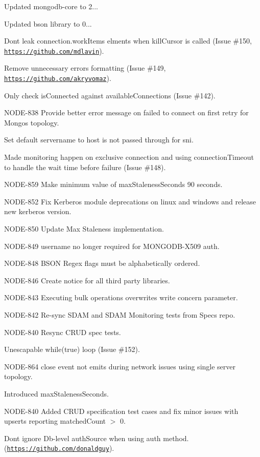 \begin{DoxyItemize}
\item Updated mongodb-\/core to 2...
\begin{DoxyItemize}
\item Updated bson library to 0...
\item Dont leak connection.\+work\+Items elments when kill\+Cursor is called (Issue \#150, \href{https://github.com/mdlavin}{\tt https\+://github.\+com/mdlavin}).
\item Remove unnecessary errors formatting (Issue \#149, \href{https://github.com/akryvomaz}{\tt https\+://github.\+com/akryvomaz}).
\item Only check is\+Connected against available\+Connections (Issue \#142).
\item N\+O\+D\+E-\/838 Provide better error message on failed to connect on first retry for Mongos topology.
\item Set default servername to host is not passed through for sni.
\item Made monitoring happen on exclusive connection and using connection\+Timeout to handle the wait time before failure (Issue \#148).
\item N\+O\+D\+E-\/859 Make minimum value of max\+Staleness\+Seconds 90 seconds.
\item N\+O\+D\+E-\/852 Fix Kerberos module deprecations on linux and windows and release new kerberos version.
\item N\+O\+D\+E-\/850 Update Max Staleness implementation.
\item N\+O\+D\+E-\/849 username no longer required for M\+O\+N\+G\+O\+D\+B-\/\+X509 auth.
\item N\+O\+D\+E-\/848 B\+S\+ON Regex flags must be alphabetically ordered.
\item N\+O\+D\+E-\/846 Create notice for all third party libraries.
\item N\+O\+D\+E-\/843 Executing bulk operations overwrites write concern parameter.
\item N\+O\+D\+E-\/842 Re-\/sync S\+D\+AM and S\+D\+AM Monitoring tests from Specs repo.
\item N\+O\+D\+E-\/840 Resync C\+R\+UD spec tests.
\item Unescapable while(true) loop (Issue \#152).
\end{DoxyItemize}
\item N\+O\+D\+E-\/864 close event not emits during network issues using single server topology.
\item Introduced max\+Staleness\+Seconds.
\item N\+O\+D\+E-\/840 Added C\+R\+UD specification test cases and fix minor issues with upserts reporting matched\+Count $>$ 0.
\item Don\textquotesingle{}t ignore Db-\/level auth\+Source when using auth method. (\href{https://github.com/donaldguy}{\tt https\+://github.\+com/donaldguy}).
\end{DoxyItemize}

